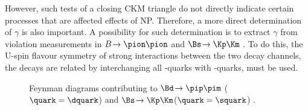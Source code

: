 However, such tests of a closing CKM triangle do not directly indicate certain processes that are affected effects of \ac{NP}.
Therefore, a more direct determination of $\gamma$ is also important.
A possibility for such determination is to extract $\gamma$ from \CP violation measurements in $B\!\to\pion\pion$ and $\Bs\!\to\Kp\Km$ \cite{GammaInLoops_Fleischer, GammaInLoops_Ciuchini}.
To do this, the U-spin flavour symmetry of strong interactions between the two decay channels, \ie the decays are related by interchanging all \dquark-quarks with \squark-quarks, must be used.
\begin{figure}[tbp]
	\centering
	
	\hfill
	
	\caption{Feynman diagrams contributing to $\Bd\!\to\pip\pim$ ($\quark=\dquark$) and $\Bs\!\to\Kp\Km$($\quark=\squark$) \cite{Ellis:2016jkw}.}
	\label{fig:feynmanGammaLoops}
\end{figure}


